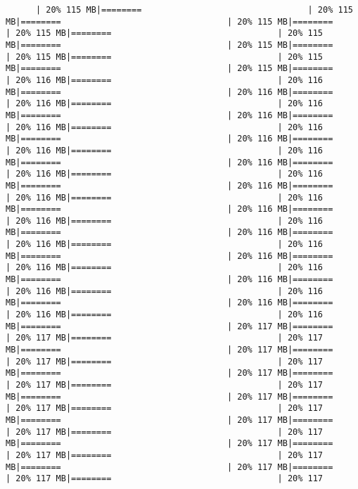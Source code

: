 \documentclass[
]{article}
\begin{document}
\begin{verbatim}
      | 20% 115 MB|========                                 | 20% 115 MB|========                                 | 20% 115 MB|========                                 | 20% 115 MB|========                                 | 20% 115 MB|========                                 | 20% 115 MB|========                                 | 20% 115 MB|========                                 | 20% 115 MB|========                                 | 20% 115 MB|========                                 | 20% 116 MB|========                                 | 20% 116 MB|========                                 | 20% 116 MB|========                                 | 20% 116 MB|========                                 | 20% 116 MB|========                                 | 20% 116 MB|========                                 | 20% 116 MB|========                                 | 20% 116 MB|========                                 | 20% 116 MB|========                                 | 20% 116 MB|========                                 | 20% 116 MB|========                                 | 20% 116 MB|========                                 | 20% 116 MB|========                                 | 20% 116 MB|========                                 | 20% 116 MB|========                                 | 20% 116 MB|========                                 | 20% 116 MB|========                                 | 20% 116 MB|========                                 | 20% 116 MB|========                                 | 20% 116 MB|========                                 | 20% 116 MB|========                                 | 20% 116 MB|========                                 | 20% 116 MB|========                                 | 20% 116 MB|========                                 | 20% 116 MB|========                                 | 20% 116 MB|========                                 | 20% 116 MB|========                                 | 20% 116 MB|========                                 | 20% 116 MB|========                                 | 20% 116 MB|========                                 | 20% 116 MB|========                                 | 20% 116 MB|========                                 | 20% 117 MB|========                                 | 20% 117 MB|========                                 | 20% 117 MB|========                                 | 20% 117 MB|========                                 | 20% 117 MB|========                                 | 20% 117 MB|========                                 | 20% 117 MB|========                                 | 20% 117 MB|========                                 | 20% 117 MB|========                                 | 20% 117 MB|========                                 | 20% 117 MB|========                                 | 20% 117 MB|========                                 | 20% 117 MB|========                                 | 20% 117 MB|========                                 | 20% 117 MB|========                                 | 20% 117 MB|========                                 | 20% 117 MB|========                                 | 20% 117 MB|========                                 | 20% 117 MB|========                                 | 20% 117 MB|========                                 | 20% 117 
\end{verbatim}
\end{document}

